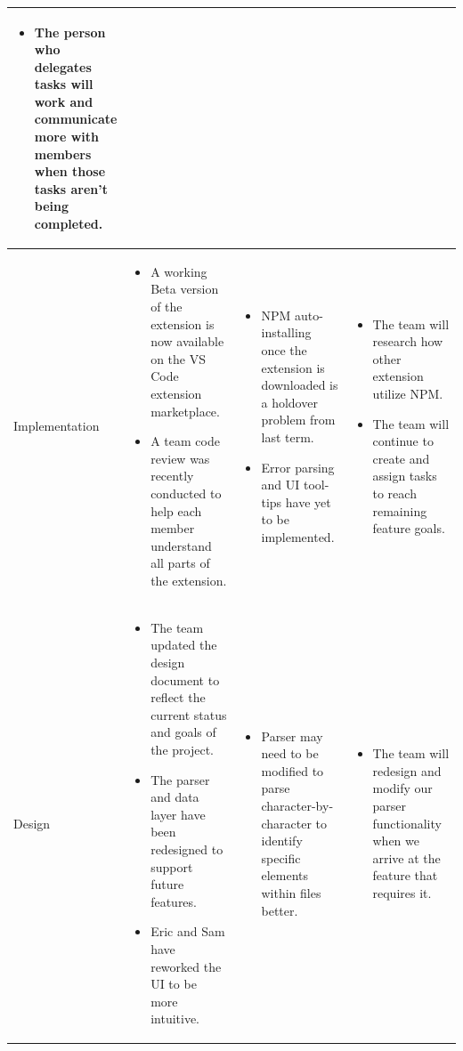 \documentclass[letterpaper,10pt,titlepage,draftclsnofoot,onecolumn,onesided] {IEEEtran}
\begin{document}
\begin{center}
\begin{singlespace}
\begin{tabular}{ |  p{0.25\linewidth}  |  p{0.25\linewidth}  | p{0.25\linewidth} | p{0.25\linewidth} |}
\begin{itemize}
				\item The person who delegates tasks will work and communicate more with members when those tasks aren't being completed.
			\end{itemize} 
		\\ \hline
			Implementation 
		& 
			\begin{itemize}
				\item A working Beta version of the extension is now available on the VS Code extension marketplace.
				\item A team code review was recently conducted to help each member understand all parts of the extension.
			\end{itemize}
		& 
			\begin{itemize}
				\item NPM auto-installing once the extension is downloaded is a holdover problem from last term.
				\item Error parsing and UI tool-tips have yet to be implemented.
			\end{itemize}
		&
			\begin{itemize}
				\item The team will research how other extension utilize NPM.
				\item The team will continue to create and assign tasks to reach remaining feature goals.
			\end{itemize} 
		\\ \hline
			Design 
		& 
			\begin{itemize}
				\item The team updated the design document to reflect the current status and goals of the project.
				\item The parser and data layer have been redesigned to support future features.
				\item Eric and Sam have reworked the UI to be more intuitive.
			\end{itemize}
		& 
			\begin{itemize}
				\item Parser may need to be modified to parse character-by-character to identify specific elements within files better.
			\end{itemize}
		&
			\begin{itemize}
				\item The team will redesign and modify our parser functionality when we arrive at the feature that requires it.
			\end{itemize} 
		\\ \hline

\end{tabular}
\end{singlespace}
\end{center}
\end{document}
